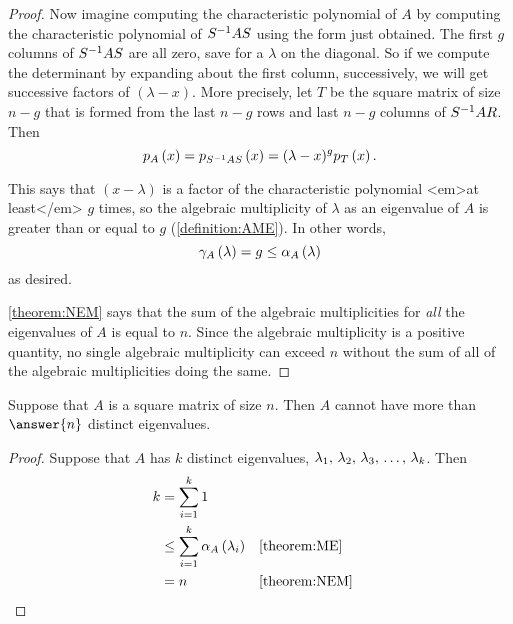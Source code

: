 \documentclass{ximera}
\begin{document}
\begin{theorem}
\begin{proof}
Now imagine computing the characteristic polynomial of $A$ by computing the characteristic polynomial of $S^{-1}AS$ using the form just obtained.  The first $g$ columns of $S^{-1}AS$ are all zero, save for a $\lambda$ on the diagonal.  So if we compute the determinant by expanding about the first column, successively, we will get successive factors of $(\lambda-x)$.  More precisely, let $T$ be the square matrix of size $n-g$ that is formed from the last $n-g$ rows and last $n-g$ columns of $S^{-1}AR$.  Then
\[
p_{A}\left(x\right)=p_{S^{-1}AS}\left(x\right)=(\lambda-x)^gp_{T}\left(x\right).
\]




This says that $(x-\lambda)$ is a factor of the characteristic polynomial <em>at least</em> $g$ times, so the algebraic multiplicity of $\lambda$ as an eigenvalue of $A$ is greater than or equal to $g$ (\ref{definition:AME}).  In other words,
\[
\gamma_{A}\left(\lambda\right)=g\leq\alpha_{A}\left(\lambda\right)
\]
as desired.



\ref{theorem:NEM} says that the sum of the algebraic multiplicities for \textit{all} the eigenvalues of $A$ is equal to $n$.  Since the algebraic multiplicity is a positive quantity, no single algebraic multiplicity can exceed $n$ without the sum of all of the algebraic multiplicities doing the same.



\end{proof}
\end{theorem}

\begin{theorem}
\label{theorem:MNEM}

Suppose that $A$ is a square matrix of size $n$.  Then $A$ cannot have more than $\answer{n}$ distinct eigenvalues.

\begin{proof}
Suppose that $A$ has $k$ distinct eigenvalues, ${\lambda}_{1},\,{\lambda}_{2},\,{\lambda}_{3},\,\ldots,\,{\lambda}_{k}$.  Then
\begin{align*}
k&=\sum_{i=1}^{k}1\\
&\leq\sum_{i=1}^{k}\alpha_{A}\left(\lambda_i\right)&&\ref{theorem:ME}\\
&=n&&\ref{theorem:NEM}
\end{align*}




\end{proof}
\end{theorem}
\end{document}
